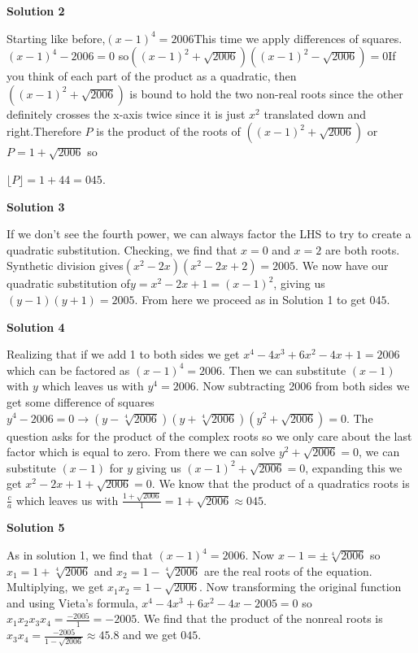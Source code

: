 \begin{enumerate}
 



\textbf{Solution 2}

Starting like before,$(x-1)^4= 2006$This time we apply differences of squares.$(x-1)^4-2006=0$ so$((x-1)^2+\sqrt{2006})((x-1)^2 -\sqrt{2006})=0$If you think of each part of the product as a quadratic, then $((x-1)^2+\sqrt{2006})$ is bound to hold the two  non-real roots since the other definitely crosses the x-axis twice since it is just $x^2$ translated down and right.Therefore $P$ is the product of the roots of $((x-1)^2+\sqrt{2006})$ or $P=1+\sqrt{2006}$ so

 $\lfloor P \rfloor = 1 + 44 = \boxed{045}$.

 



\textbf{Solution 3}

If we don't see the fourth power, we can always factor the LHS to try to create a quadratic substitution. Checking, we find that $x=0$ and $x=2$ are both roots. Synthetic division gives$(x^2-2x)(x^2-2x+2)=2005$. We now have our quadratic substitution of$y=x^2-2x+1=(x-1)^2$, giving us$(y-1)(y+1)=2005$. From here we proceed as in Solution 1 to get $\boxed{045}$.

 



\textbf{Solution 4}

Realizing that if we add 1 to both sides we get $x^4-4x^3+6x^2-4x+1=2006$ which can be factored as $(x-1)^4=2006$. Then we can substitute $(x-1)$ with $y$ which leaves us with $y^4=2006$. Now subtracting 2006 from both sides we get some difference of squares $y^4-2006=0 \rightarrow (y-\sqrt[4]{2006})(y+\sqrt[4]{2006})(y^2+\sqrt{2006})=0$. The question asks for the product of the complex roots so we only care about the last factor which is equal to zero. From there we can solve $y^2+\sqrt{2006}=0$, we can substitute $(x-1)$ for $y$ giving us  $(x-1)^2+\sqrt{2006}=0$, expanding this we get $x^2-2x+1+\sqrt{2006}=0$. We know that the product of a quadratics roots is $\frac{c}{a}$ which leaves us with $\frac{1+\sqrt{2006}}{1}=1+\sqrt{2006}\approx\boxed{045}$.

 



\textbf{Solution 5}

As in solution 1, we find that $(x-1)^4 = 2006$. Now $x-1=\pm \sqrt[4]{2006}$ so $x_1 = 1+\sqrt[4]{2006}$ and $x_2 = 1-\sqrt[4]{2006}$ are the real roots of the equation. Multiplying, we get $x_1 x_2 = 1 - \sqrt{2006}$. Now transforming the original function and using Vieta's formula, $x^4-4x^3+6x^2-4x-2005=0$ so $x_1 x_2 x_3 x_4 = \frac{-2005}{1} = -2005$. We find that the product of the nonreal roots is $x_3 x_4 = \frac{-2005}{1-\sqrt{2006}} \approx 45.8$ and we get $\boxed{045}$.


\end{enumerate}
